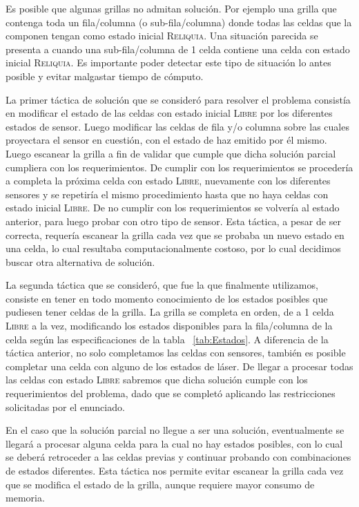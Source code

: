 \documentclass[11pt, a4paper, twoside]{article}
\begin{document}
Es posible que algunas grillas no admitan solución. Por ejemplo una grilla que 
contenga toda un fila/columna (o sub-fila/columna) donde todas las celdas que la 
componen tengan como estado inicial \textsc{Reliquia}. Una situación parecida se 
presenta a cuando una sub-fila/columna de 1 celda contiene una celda con 
estado inicial \textsc{Reliquia}. Es importante poder detectar este tipo 
de situación lo antes posible y evitar malgastar tiempo de cómputo.

La primer táctica de solución que se consideró para resolver el problema
consistía en modificar el estado de las celdas con estado inicial \textsc{Libre}
por los diferentes estados de sensor. Luego modificar las celdas de fila y/o 
columna sobre las cuales proyectara el sensor en cuestión, con el estado de haz emitido
por él mismo. Luego escanear la grilla a fin de validar que cumple que dicha 
solución parcial cumpliera con los requerimientos. De cumplir con los requerimientos 
se procedería a completa la próxima celda con estado \textsc{Libre}, nuevamente 
con los diferentes sensores y se repetiría el mismo procedimiento hasta que no haya
celdas con estado inicial \textsc{Libre}. De no cumplir con los requerimientos 
se volvería al estado anterior, para luego probar con otro tipo de sensor.
Esta táctica, a pesar de ser correcta, requería escanear la grilla cada
vez que se probaba un nuevo estado en una celda, lo cual resultaba
computacionalmente costoso, por lo cual decidimos buscar otra alternativa de solución.

La segunda táctica que se consideró, que fue la que finalmente utilizamos,
consiste en tener en todo momento conocimiento de los estados posibles 
que pudiesen tener celdas de la grilla. La grilla se completa en orden,
de a 1 celda \textsc{Libre} a la vez, modificando los estados disponibles 
para  la fila/columna  de la celda según las especificaciones de la tabla ~\ref{tab:Estados}.
A diferencia de la táctica anterior, no solo completamos las celdas con sensores,
también es posible completar una celda con alguno de los estados de láser.
De llegar a procesar todas las celdas con estado \textsc{Libre} sabremos que dicha 
solución cumple con los requerimientos del problema, dado que se completó
aplicando las restricciones solicitadas por el enunciado.

En el caso que la solución parcial no llegue a ser una solución, eventualmente
se llegará a procesar alguna celda para la cual no hay estados posibles,
con lo cual se deberá retroceder a las celdas previas y continuar probando
con combinaciones de estados diferentes. Esta táctica nos permite evitar 
escanear la grilla cada vez que se modifica el estado de la grilla, 
aunque requiere mayor consumo de memoria. 
\end{document}
